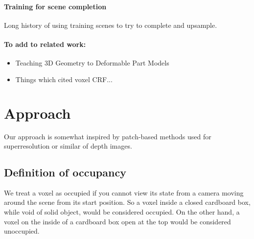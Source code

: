 \documentclass[10pt,twocolumn,letterpaper]{article}
\begin{document}
\paragraph{Training for scene completion}
Long history of using training scenes to try to complete and upsample.

\paragraph{To add to related work:}
\begin{itemize}
\item Teaching 3D Geometry to Deformable Part Models
\item Things which cited voxel CRF...
\end{itemize}




\section{Approach}

Our approach is somewhat inspired by patch-based methods used for superresolution or similar of depth images. 





\subsection{Definition of occupancy}

We treat a voxel as occupied if you cannot view its state from a camera moving around the scene from its start position.
So a voxel inside a closed cardboard box, while void of solid object, would be considered occupied.
On the other hand, a voxel on the inside of a cardboard box open at the top would be considered unoccupied.
\end{document}
